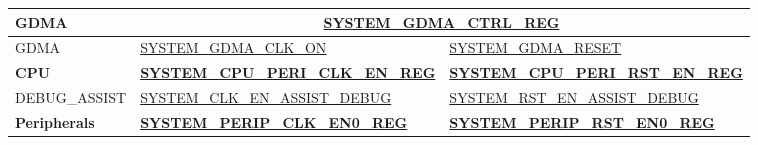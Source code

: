 \documentclass[main\_\_EN.tex]{subfiles}
\begin{document}
\begin{ThreePartTable}
\begin{longtable}[c]{ |l|l|l| }
    \textbf{GDMA} & \multicolumn{2}{|c|}{\textbf{\hyperref[regdesc:SYSTEMGDMACTRLREG]{SYSTEM\_GDMA\_CTRL\_REG}}} \\\hline

    GDMA & \hyperref[fielddesc:SYSTEMGDMACLKON]{SYSTEM\_GDMA\_CLK\_ON} & \hyperref[fielddesc:SYSTEMGDMARESET]{SYSTEM\_GDMA\_RESET} \\\hline



    \textbf{CPU} & \textbf{\hyperref[regdesc:SYSTEMCPUPERICLKENREG]{SYSTEM\_CPU\_PERI\_CLK\_EN\_REG}} & \textbf{\hyperref[regdesc:SYSTEMCPUPERIRSTENREG]{SYSTEM\_CPU\_PERI\_RST\_EN\_REG}} \\ \hline
    DEBUG\_ASSIST & \hyperref[fielddesc:SYSTEMCLKENASSISTDEBUG]{SYSTEM\_CLK\_EN\_ASSIST\_DEBUG} & \hyperref[fielddesc:SYSTEMRSTENASSISTDEBUG]{SYSTEM\_RST\_EN\_ASSIST\_DEBUG} \\\hline


    \textbf{Peripherals} & \textbf{\hyperref[regdesc:SYSTEMPERIPCLKEN0REG]{SYSTEM\_PERIP\_CLK\_EN0\_REG}} &  \textbf{\hyperref[regdesc:SYSTEMPERIPRSTEN0REG]{SYSTEM\_PERIP\_RST\_EN0\_REG}} \\ \hline


\end{longtable}
\end{ThreePartTable}
\end{document}
